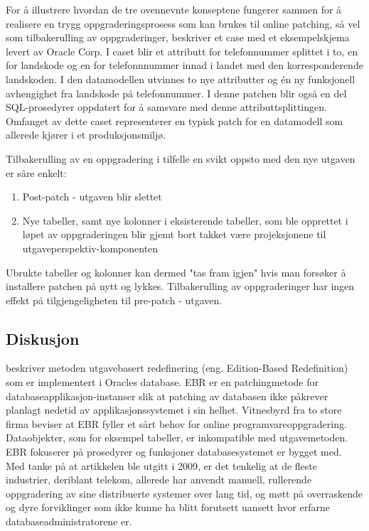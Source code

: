 For å illustrere hvordan de tre ovennevnte konseptene fungerer sammen for å realisere en trygg oppgraderingsprosess som kan brukes til online patching, så vel som tilbakerulling av oppgraderinger, beskriver \cite{choi2009} et case med et eksempelskjema levert av Oracle Corp. I caset blir et attributt for telefonnummer splittet i to, en for landskode og en for telefonnnummer innad i landet med den korresponderende landskoden. I den datamodellen utvinnes to nye attributter og én ny funksjonell avhengighet fra landskode på telefonnummer. I denne patchen blir også en del SQL-prosedyrer oppdatert for å samsvare med denne attributtsplittingen. Omfanget av dette caset representerer en typisk patch for en datamodell som allerede kjører i et produksjonsmiljø.

Tilbakerulling av en oppgradering i tilfelle en svikt oppsto med den nye utgaven er såre enkelt:
\begin{enumerate}
  \item Post-patch - utgaven blir slettet
  \item Nye tabeller, samt nye kolonner i eksisterende tabeller, som ble opprettet i løpet av oppgraderingen blir gjemt bort takket være projeksjonene til utgaveperspektiv-komponenten
\end{enumerate}

Ubrukte tabeller og kolonner kan dermed "tas fram igjen" \citep{choi2009} hvis man forsøker å installere patchen på nytt og lykkes. Tilbakerulling av oppgraderinger har ingen effekt på tilgjengeligheten til pre-patch - utgaven.

\subsection{Diskusjon}
\cite{choi2009} beskriver metoden utgavebasert redefinering (eng. Edition-Based Redefinition) som er implementert i Oracles database. EBR er en patchingmetode for databaseapplikasjon-instanser slik at patching av databasen ikke påkrever planlagt nedetid av applikasjonssystemet i sin helhet. Vitnesbyrd fra to store firma beviser at EBR fyller et sårt behov for online programvareoppgradering. Dataobjekter, som for eksempel tabeller, er inkompatible med utgavemetoden. EBR fokuserer på prosedyrer og funksjoner databasesystemet er bygget med. Med tanke på at artikkelen ble utgitt i 2009, er det tenkelig at de fleste industrier, deriblant telekom, allerede har anvendt manuell, rullerende oppgradering av sine distribuerte systemer over lang tid, og møtt på overraskende og dyre forviklinger som ikke kunne ha blitt forutsett uansett hvor erfarne databaseadministratorene er.


